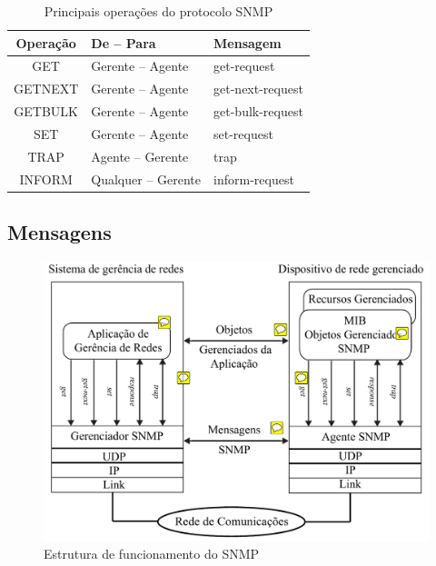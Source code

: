 \documentclass[twoside,english,brazilian]{UNISINOSmonografia}
\begin{document}
\begin{table}
	\centering
	\caption{Principais operações do protocolo SNMP}
	\label{tab:operacoesSNMP}
	\begin{minipage}{.60\textwidth}
		\begin{tabulary}{\textwidth}{CLL}
	\hline
		\textbf{Operação}   &  
		\textbf{De -- Para} & 
		\textbf{Mensagem}  \\ 
	\hline
		GET     & Gerente -- Agente   & get-request      \\
		GETNEXT & Gerente -- Agente   & get-next-request \\
		GETBULK & Gerente -- Agente   & get-bulk-request \\
		SET     & Gerente -- Agente   & set-request      \\
		TRAP    & Agente -- Gerente   & trap             \\
		INFORM  & Qualquer -- Gerente & inform-request   \\ 
	\hline
		\end{tabulary}
	\end{minipage}
\end{table}

\subsection{Mensagens}
\label{sec:mensagens}

\begin{figure}
	\caption{Estrutura de funcionamento do SNMP}
	\label{fig:snmp-stack}
	\centering
	\begin{minipage}{.8\textwidth}
		\includegraphics[width=\textwidth,keepaspectratio=true]{snmp_stack}
	\end{minipage}
\end{figure}
\end{document}
